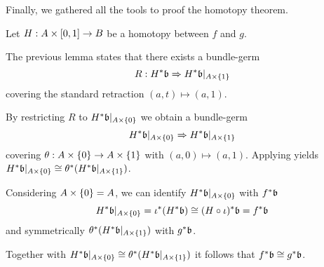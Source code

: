 \begin{myparagraph}
    Finally, we gathered all the tools to proof the homotopy theorem.
\end{myparagraph}

\begin{myproof}
    Let $H: A \times{} [0, 1] \to B$ be a homotopy between $f$ and $g$.

    The previous lemma states that there exists a bundle-germ
    \[ R: H^*\mathfrak{b} \Rightarrow{} H^*\mathfrak{b}\vert_{A \times{} \{1\}} \]
    covering the standard retraction $(a, t) \mapsto (a, 1)$.

    By restricting $R$ to $H^*\mathfrak{b}\vert_{A \times{} \{0\}}$ we obtain a bundle-germ
    \[ H^*\mathfrak{b}\vert_{A \times{} \{0\}} \Rightarrow{} H^*\mathfrak{b}\vert_{A \times{} \{1\}} \]
    covering $\theta: A \times{} \{0\} \to A \times{} \{1\}$ with $(a, 0) \mapsto (a, 1)$.
    Applying  yields $H^*\mathfrak{b}\vert_{A \times{} \{0\}} \cong \theta^*(H^*\mathfrak{b}\vert_{A \times{} \{1\}})$.

    Considering $A \times{} \{0\} = A$, we can identify $H^*\mathfrak{b}\vert_{A \times{} \{0\}}$ with $f^*\mathfrak{b}$
    \[ H^*\mathfrak{b}\vert_{A \times \{0\}} = \iota^*(H^*\mathfrak{b}) \cong (H \circ \iota)^*\mathfrak{b} = f^*\mathfrak{b} \]
    and symmetrically $\theta^*(H^*\mathfrak{b}\vert_{A \times{} \{1\}})$ with $g^*\mathfrak{b}$.

    Together with $H^*\mathfrak{b}\vert_{A \times{} \{0\}} \cong \theta^*(H^*\mathfrak{b}\vert_{A \times{} \{1\}})$ it follows that $f^*\mathfrak{b} \cong g^*\mathfrak{b}$.
\end{myproof}
